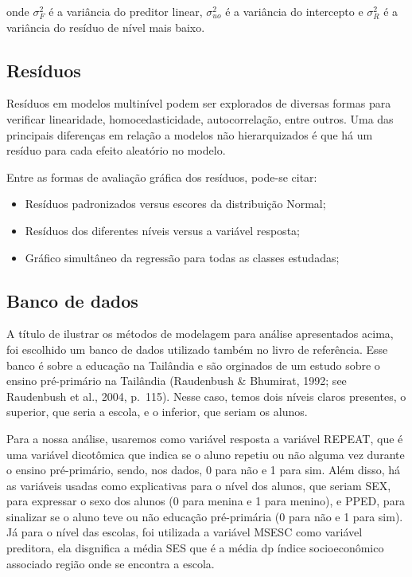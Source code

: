 \documentclass[
  letterpaper,
  DIV=11,
  numbers=noendperiod]{scrartcl}
\providecommand{\tightlist}{%
  \setlength{\itemsep}{0pt}\setlength{\parskip}{0pt}}\usepackage{longtable,booktabs,array}
\begin{document}
onde \(\sigma^2_{F}\) é a variância do preditor linear,
\(\sigma^2_{uo}\) é a variância do intercepto e \(\sigma^2_{R}\) é a
variância do resíduo de nível mais baixo.

\hypertarget{resuxedduos}{%
\subsection{Resíduos}\label{resuxedduos}}

Resíduos em modelos multinível podem ser explorados de diversas formas
para verificar linearidade, homocedasticidade, autocorrelação, entre
outros. Uma das principais diferenças em relação a modelos não
hierarquizados é que há um resíduo para cada efeito aleatório no modelo.

Entre as formas de avaliação gráfica dos resíduos, pode-se citar:

\begin{itemize}
\tightlist
\item
  Resíduos padronizados versus escores da distribuição Normal;
\item
  Resíduos dos diferentes níveis versus a variável resposta;
\item
  Gráfico simultâneo da regressão para todas as classes estudadas;
\end{itemize}

\hypertarget{banco-de-dados}{%
\subsection{Banco de dados}\label{banco-de-dados}}

A título de ilustrar os métodos de modelagem para análise apresentados
acima, foi escolhido um banco de dados utilizado também no livro de
referência. Esse banco é sobre a educação na Tailândia e são orginados
de um estudo sobre o ensino pré-primário na Tailândia (Raudenbush \&
Bhumirat, 1992; see Raudenbush et al., 2004, p.~115). Nesse caso, temos
dois níveis claros presentes, o superior, que seria a escola, e o
inferior, que seriam os alunos.

Para a nossa análise, usaremos como variável resposta a variável REPEAT,
que é uma variável dicotômica que indica se o aluno repetiu ou não
alguma vez durante o ensino pré-primário, sendo, nos dados, 0 para não e
1 para sim. Além disso, há as variáveis usadas como explicativas para o
nível dos alunos, que seriam SEX, para expressar o sexo dos alunos (0
para menina e 1 para menino), e PPED, para sinalizar se o aluno teve ou
não educação pré-primária (0 para não e 1 para sim). Já para o nível das
escolas, foi utilizada a variável MSESC como variável preditora, ela
disgnifica a média SES que é a média dp índice socioeconômico associado
região onde se encontra a escola.
\end{document}
